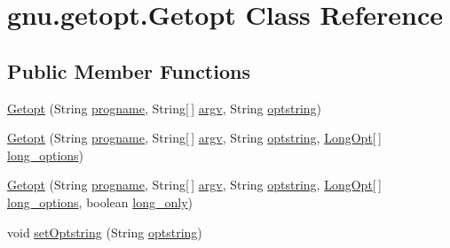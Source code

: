 \hypertarget{classgnu_1_1getopt_1_1_getopt}{
\section{gnu.getopt.Getopt Class Reference}
\label{classgnu_1_1getopt_1_1_getopt}
}
\subsection*{Public Member Functions}
\begin{DoxyCompactItemize}
\item 
\hyperlink{classgnu_1_1getopt_1_1_getopt_a7babf5343414128369b45f7eb90882c1}{Getopt} (String \hyperlink{classgnu_1_1getopt_1_1_getopt_aef9686af24b220286d279467d2741a6d}{progname}, String\mbox{[}$\,$\mbox{]} \hyperlink{classgnu_1_1getopt_1_1_getopt_adde2117f0df42f3254b37b05fd9833cf}{argv}, String \hyperlink{classgnu_1_1getopt_1_1_getopt_a3a731b226188580b7cf0928b97d0502d}{optstring})
\item 
\hyperlink{classgnu_1_1getopt_1_1_getopt_a5953b9f2928dd3cb130d6a6767f4a613}{Getopt} (String \hyperlink{classgnu_1_1getopt_1_1_getopt_aef9686af24b220286d279467d2741a6d}{progname}, String\mbox{[}$\,$\mbox{]} \hyperlink{classgnu_1_1getopt_1_1_getopt_adde2117f0df42f3254b37b05fd9833cf}{argv}, String \hyperlink{classgnu_1_1getopt_1_1_getopt_a3a731b226188580b7cf0928b97d0502d}{optstring}, \hyperlink{classgnu_1_1getopt_1_1_long_opt}{LongOpt}\mbox{[}$\,$\mbox{]} \hyperlink{classgnu_1_1getopt_1_1_getopt_a5baa01494994d09203b475edd9c9eb98}{long\_\-options})
\item 
\hyperlink{classgnu_1_1getopt_1_1_getopt_aa28cedbcac63dcef002fefe837edc288}{Getopt} (String \hyperlink{classgnu_1_1getopt_1_1_getopt_aef9686af24b220286d279467d2741a6d}{progname}, String\mbox{[}$\,$\mbox{]} \hyperlink{classgnu_1_1getopt_1_1_getopt_adde2117f0df42f3254b37b05fd9833cf}{argv}, String \hyperlink{classgnu_1_1getopt_1_1_getopt_a3a731b226188580b7cf0928b97d0502d}{optstring}, \hyperlink{classgnu_1_1getopt_1_1_long_opt}{LongOpt}\mbox{[}$\,$\mbox{]} \hyperlink{classgnu_1_1getopt_1_1_getopt_a5baa01494994d09203b475edd9c9eb98}{long\_\-options}, boolean \hyperlink{classgnu_1_1getopt_1_1_getopt_a81e9a30f84d4dc8e7b28e1d1dcecbd4c}{long\_\-only})
\item 
void \hyperlink{classgnu_1_1getopt_1_1_getopt_a2cc4f71348a33281ee943cc20b0af90a}{setOptstring} (String \hyperlink{classgnu_1_1getopt_1_1_getopt_a3a731b226188580b7cf0928b97d0502d}{optstring})
\item 

\end{DoxyCompactItemize}
